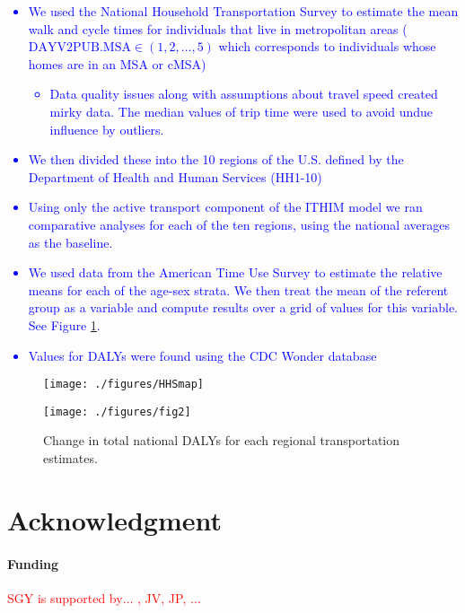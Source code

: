 \documentclass{bioinfo}
\newcommand{\col}[2][red]{\textcolor{#1}{#2}}
\newcommand{\bi}{\begin{itemize}}
\newcommand{\ei}{\end{itemize}}
\begin{document}
\col[blue]{\begin{itemize}
\item We used the National Household Transportation Survey \cite{NHTS} to
  estimate the mean walk and cycle times for individuals that live in
  metropolitan areas ($\textrm{DAYV2PUB.MSA} \in (1,2,\ldots,5)$ which
  corresponds to individuals whose homes are in an MSA or cMSA)
  \bi\item Data quality issues along with assumptions about travel speed
created mirky data.  The median values of trip time were used to avoid
undue influence by outliers.\ei
\item We then divided these into the 10 regions of the U.S. defined by
  the Department of Health and Human Services (HH1-10)
\item Using only the active transport component of the ITHIM model we
  ran comparative analyses for each of the ten regions, using the
  national averages as the baseline.
\item We used data from the American Time Use Survey \cite{ATUS} to
  estimate the relative means for each of the age-sex strata.  We then
  treat the mean of the referent group as a variable and compute
  results over a grid of values for this variable.  See Figure
  \ref{dalyFigure}.
\item Values for DALYs were found using the CDC Wonder database \cite{CDCWonder}
\end{itemize}}


\begin{figure}[t]
    \centerline{\texttt{[image: ./figures/HHSmap]}}
    \centerline{\texttt{[image: ./figures/fig2]}}
    \caption{Change in total national DALYs for each regional
      transportation estimates.}\label{dalyFigure}
\end{figure}

\section*{Acknowledgment}
\paragraph{Funding\textcolon} \col[red]{SGY is supported by$\ldots$ , JV, JP, $\ldots$}

%

%

\end{document}
